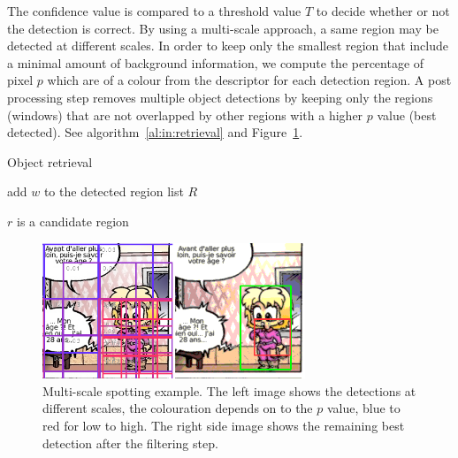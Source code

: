 The confidence value is compared to a threshold value $T$ to decide whether or not the detection is correct. By using a multi-scale approach, a same region may be detected at different scales. In order to keep only the smallest region that include a minimal amount of background information, we compute the percentage of pixel $p$ which are of a colour from the descriptor for each detection region. 
A post processing step removes multiple object detections by keeping only the regions (windows) that are not overlapped by other regions with a higher $p$ value (best detected). See algorithm~\ref{al:in:retrieval} and Figure~\ref{fig:in:filtering}.

\begin{algorithm}
\caption{Object retrieval}
\label{al:in:retrieval}
\begin{algorithmic}
  
    
	\STATE add $w$ to the detected region list $R$
    \ENDIF  
  \ENDFOR
\ENDFOR

\STATE{}
	     \STATE $r$ is a candidate region
    \ENDIF
\ENDFOR
\end{algorithmic}
\end{algorithm}



 \begin{figure}[!ht]  %
   \centering
  \includegraphics[trim= 0px 1px 0mm 0mm, clip,width=0.7\textwidth]{filtering.png}
  \caption[Multi-scale comic character spotting]{Multi-scale spotting example. The left image shows the detections at different scales, the colouration depends on to the $p$ value, blue to red for low to high. The right side image shows the remaining best detection after the filtering step. }
  \label{fig:in:filtering}
 \end{figure}



